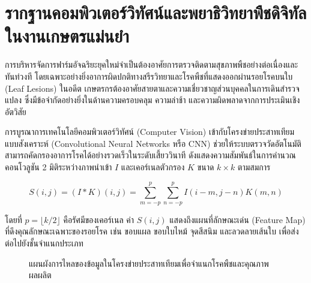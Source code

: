 \newpage

\section{รากฐานคอมพิวเตอร์วิทัศน์และพยาธิวิทยาพืชดิจิทัลในงานเกษตรแม่นยำ}

การบริหารจัดการฟาร์มอัจฉริยะยุคใหม่จำเป็นต้องอาศัยการตรวจติดตามสุขภาพพืชอย่างต่อเนื่องและทันท่วงที โดยเฉพาะอย่างยิ่งอาการผิดปกติทางสรีรวิทยาและโรคพืชที่แสดงออกผ่านรอยโรคบนใบ (Leaf Lesions) ในอดีต เกษตรกรต้องอาศัยสายตาและความเชี่ยวชาญส่วนบุคคลในการเดินสำรวจแปลง ซึ่งมีข้อจำกัดอย่างยิ่งในด้านความครอบคลุม ความล่าช้า และความผิดพลาดจากการประเมินเชิงอัตวิสัย

การบูรณาการเทคโนโลยีคอมพิวเตอร์วิทัศน์ (Computer Vision) เข้ากับโครงข่ายประสาทเทียมแบบสังเคราะห์ (Convolutional Neural Networks หรือ CNN) ช่วยให้ระบบตรวจวัดอัตโนมัติสามารถคัดกรองอาการโรคได้อย่างรวดเร็วในระดับเสี้ยววินาที ดังแสดงความสัมพันธ์ในการคำนวณคอนโวลูชัน 2 มิติระหว่างภาพนำเข้า $I$ และเคอร์เนลตัวกรอง $K$ ขนาด $k \times k$ ตามสมการ

\begin{equation}
    S(i, j) = (I * K)(i, j) = \sum_{m=-p}^{p} \sum_{n=-p}^{p} I(i-m, j-n) K(m, n)
\end{equation}

\noindent โดยที่ $p = \lfloor k/2 \rfloor$ คือรัศมีของเคอร์เนล ค่า $S(i, j)$ แสดงถึงแผนที่ลักษณะเด่น (Feature Map) ที่ดึงคุณลักษณะเฉพาะของรอยโรค เช่น ขอบแผล ขอบใบไหม้ จุดสีสนิม และลวดลายเส้นใบ เพื่อส่งต่อไปยังชั้นจำแนกประเภท

\begin{figure}[H]
    \centering
    \caption{แผนผังการไหลของข้อมูลในโครงข่ายประสาทเทียมเพื่อจำแนกโรคพืชและคุณภาพผลผลิต}
    \label{fig:cnn_pipeline}
\end{figure}

